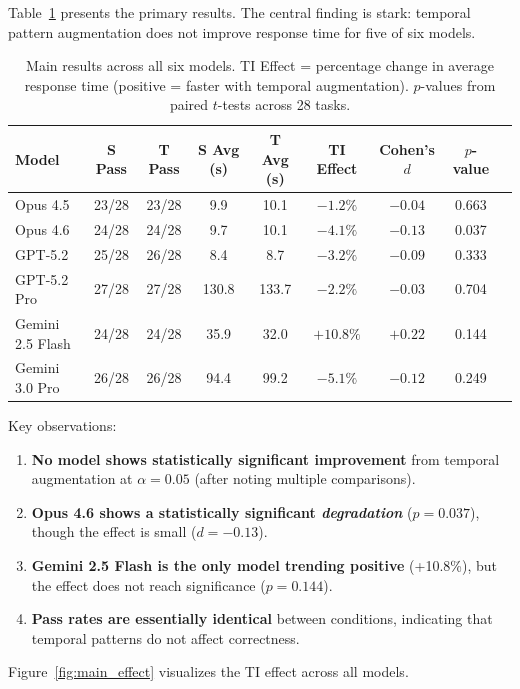 \documentclass[11pt]{article}
\begin{document}
Table~\ref{tab:main_results} presents the primary results. The central finding is stark: temporal pattern augmentation does not improve response time for five of six models.

\begin{table}[ht]
\centering
\caption{Main results across all six models. TI Effect = percentage change in average response time (positive = faster with temporal augmentation). $p$-values from paired $t$-tests across 28 tasks.}
\label{tab:main_results}
\begin{tabular}{lcccccccc}
\toprule
\textbf{Model} & \textbf{S Pass} & \textbf{T Pass} & \textbf{S Avg (s)} & \textbf{T Avg (s)} & \textbf{TI Effect} & \textbf{Cohen's $d$} & \textbf{$p$-value} \\
\midrule
Opus 4.5 & 23/28 & 23/28 & 9.9 & 10.1 & $-1.2\%$ & $-0.04$ & 0.663 \\
Opus 4.6 & 24/28 & 24/28 & 9.7 & 10.1 & $-4.1\%$ & $-0.13$ & 0.037 \\
GPT-5.2 & 25/28 & 26/28 & 8.4 & 8.7 & $-3.2\%$ & $-0.09$ & 0.333 \\
GPT-5.2 Pro & 27/28 & 27/28 & 130.8 & 133.7 & $-2.2\%$ & $-0.03$ & 0.704 \\
Gemini 2.5 Flash & 24/28 & 24/28 & 35.9 & 32.0 & $+10.8\%$ & $+0.22$ & 0.144 \\
Gemini 3.0 Pro & 26/28 & 26/28 & 94.4 & 99.2 & $-5.1\%$ & $-0.12$ & 0.249 \\
\bottomrule
\end{tabular}
\end{table}

Key observations:
\begin{enumerate}[nosep]
    \item \textbf{No model shows statistically significant improvement} from temporal augmentation at $\alpha = 0.05$ (after noting multiple comparisons).
    \item \textbf{Opus 4.6 shows a statistically significant \emph{degradation}} ($p = 0.037$), though the effect is small ($d = -0.13$).
    \item \textbf{Gemini 2.5 Flash is the only model trending positive} (+10.8\%), but the effect does not reach significance ($p = 0.144$).
    \item \textbf{Pass rates are essentially identical} between conditions, indicating that temporal patterns do not affect correctness.
\end{enumerate}

Figure~\ref{fig:main_effect} visualizes the TI effect across all models.
\end{document}
